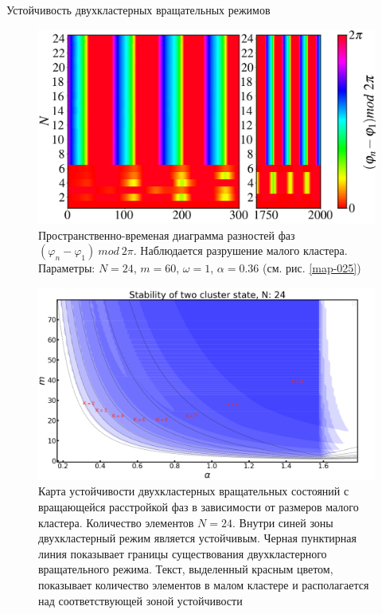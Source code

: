 \begin{chapter}{Устойчивость двухкластерных вращательных режимов}
	\begin{figure}[h!]
		\begin{center}
			\includegraphics[width=0.92\columnwidth]{pictures/Figure_yuy.png}
		\end{center}
		\caption{Пространственно-временая диаграмма разностей фаз $(\varphi_n - \varphi_1) \ mod \ 2\pi$.
		Наблюдается разрушение малого кластера.
		Параметры: $N=24$, $m = 60$, $\omega = 1$, $\alpha = 0.36$ (см. рис. \ref{map-025})}
		\label{st-c-4}
	\end{figure}

	\begin{figure}[h!]
		\begin{center}
			\includegraphics[width=1\columnwidth]{pictures/st-map.png}
		\end{center}
		\caption{Карта устойчивости двухкластерных вращательных состояний с вращающейся расстройкой фаз в зависимости от размеров малого кластера.
		Количество элементов $N = 24$. Внутри синей зоны двухкластерный режим является устойчивым. Черная пунктирная линия показывает
		границы существования двухкластерного вращательного режима. Текст, выделенный красным цветом, показывает количество элементов в малом
		кластере и располагается над соответствующей зоной устойчивости}
		\label{su-map}
	\end{figure}

\end{chapter}